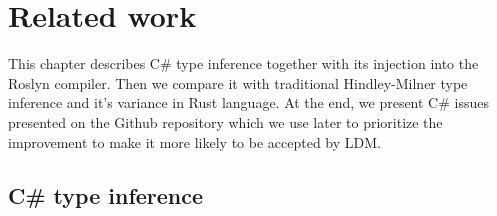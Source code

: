 \chapter{Related work}

This chapter describes C\# type inference together with its injection into the Roslyn compiler.
Then we compare it with traditional Hindley-Milner type inference and it's variance in Rust language.
At the end, we present C\# issues presented on the Github repository which we use later to prioritize the improvement to make it more likely to be accepted by \ac{LDM}.

\section{C\# type inference}


